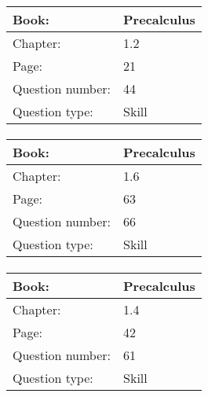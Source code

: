 \documentclass{article}
\begin{document}
            \paragraph{}
            \begin{tabularx}{1\textwidth}{
                    p{}
                    p{}
                }
                \toprule
                Book: & Precalculus
                \\
                \midrule
                Chapter: & 1.2
                \\
                \midrule
                Page: & 21
                \\
                \midrule
                Question number: & 44
                \\
                \midrule
                Question type: & Skill
                \\
                \bottomrule
            \end{tabularx}
            
            \paragraph{}
            \begin{tabularx}{1\textwidth}{
                    p{}
                    p{}
                }
                \toprule
                Book: & Precalculus
                \\
                \midrule
                Chapter: & 1.6
                \\
                \midrule
                Page: & 63
                \\
                \midrule
                Question number: & 66
                \\
                \midrule
                Question type: & Skill
                \\
                \bottomrule
            \end{tabularx}
            
            \paragraph{}
            \begin{tabularx}{1\textwidth}{
                    p{}
                    p{}
                }
                \toprule
                Book: & Precalculus
                \\
                \midrule
                Chapter: & 1.4
                \\
                \midrule
                Page: & 42
                \\
                \midrule
                Question number: & 61
                \\
                \midrule
                Question type: & Skill
                \\
                \bottomrule
            \end{tabularx}
            
\end{document}
